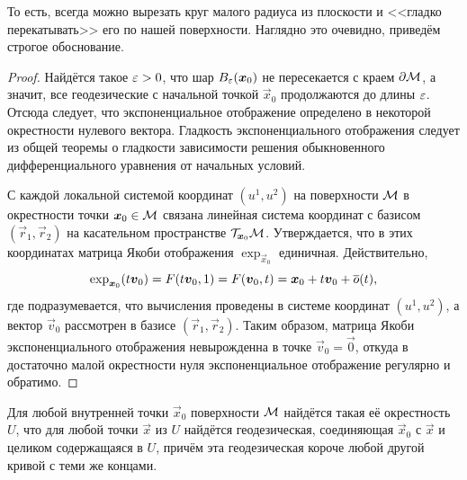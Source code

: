 То есть, всегда можно вырезать круг малого радиуса из плоскости и <<гладко перекатывать>> его по нашей поверхности. Наглядно это очевидно, приведём строгое обоснование.

\begin{proof}
	Найдётся такое $\varepsilon > 0$, что шар $B_{\varepsilon}(\boldsymbol{x}_0)$ не пересекается с краем $\partial\mathcal{M}$, а значит, все геодезические с начальной точкой $\vec{x}_0$ продолжаются до длины $\varepsilon$. Отсюда следует, что экспоненциальное отображение определено в некоторой окрестности нулевого вектора. Гладкость экспоненциального отображения следует из общей теоремы о гладкости зависимости решения обыкновенного дифференциального уравнения от начальных условий.

	С каждой локальной системой координат $(u^1, u^2)$ на поверхности $\mathcal{M}$ в окрестности точки $\boldsymbol{x}_0 \in \mathcal{M}$ связана линейная система координат с базисом $(\vec{r}_1, \vec{r}_2)$ на касательном пространстве $\mathcal{T}_{\boldsymbol{x}_0}\mathcal{M}$. Утверждается, что в этих координатах матрица Якоби отображения $\exp_{\vec{x}_0}$ единичная. Действительно,
	\[
		\exp_{\boldsymbol{x}_0}(t\boldsymbol{v}_0) = F(t\boldsymbol{v}_0, 1) = F(\boldsymbol{v}_0, t) = \boldsymbol{x}_0 + t\boldsymbol{v}_0 + \overline{o}(t),
	\]
	где подразумевается, что вычисления проведены в системе координат $(u^1, u^2)$, а вектор $\vec{v}_0$ рассмотрен в базисе $(\vec{r}_1, \vec{r}_2)$. Таким образом, матрица Якоби экспоненциального отображения невырожденна в точке $\vec{v}_0 = \vec{0}$, откуда в достаточно малой окрестности нуля экспоненциальное отображение регулярно и обратимо.
\end{proof}

\begin{theorem} \label{theorem:Eexp}
	Для любой внутренней точки $\vec{x}_0$ поверхности $\mathcal{M}$ найдётся такая её окрестность $U$, что для любой точки $\vec{x}$ из $U$ найдётся геодезическая, соединяющая $\vec{x}_0$ с $\vec{x}$ и целиком содержащаяся в $U$, причём эта геодезическая короче любой другой кривой с теми же концами.
\end{theorem}

